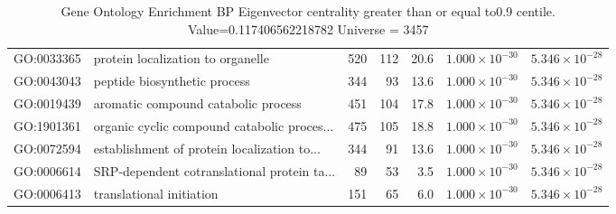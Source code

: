 \begin{table}[ht]
\begin{adjustbox}{width=\textwidth}
\begin{tabular}{llrrrrr}
  GO:0033365 & protein localization to organelle & 520 & 112 & 20.6 & $1.000 \times 10^{-30}$ & $5.346 \times 10^{-28}$ \\ 
  GO:0043043 & peptide biosynthetic process & 344 & 93 & 13.6 & $1.000 \times 10^{-30}$ & $5.346 \times 10^{-28}$ \\ 
  GO:0019439 & aromatic compound catabolic process & 451 & 104 & 17.8 & $1.000 \times 10^{-30}$ & $5.346 \times 10^{-28}$ \\ 
  GO:1901361 & organic cyclic compound catabolic proces... & 475 & 105 & 18.8 & $1.000 \times 10^{-30}$ & $5.346 \times 10^{-28}$ \\ 
  GO:0072594 & establishment of protein localization to... & 344 & 91 & 13.6 & $1.000 \times 10^{-30}$ & $5.346 \times 10^{-28}$ \\ 
  GO:0006614 & SRP-dependent cotranslational protein ta... & 89 & 53 & 3.5 & $1.000 \times 10^{-30}$ & $5.346 \times 10^{-28}$ \\ 
  GO:0006413 & translational initiation & 151 & 65 & 6.0 & $1.000 \times 10^{-30}$ & $5.346 \times 10^{-28}$ \\ 
   \hline
\end{tabular}
\end{adjustbox}
\caption{Gene Ontology Enrichment BP Eigenvector centrality  greater than or equal to0.9 centile.   Value=0.117406562218782 Universe = 3457} 
\label{tab:Gene Ontology Enrichment BP Eigenvector centrality  greater than or equal to0.9 centile.   Value=0.117406562218782 Universe = 3457}
\end{table}

